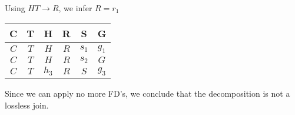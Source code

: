 \documentclass[12pt,letterpaper]{article}
\begin{document}
\begin{enumerate}
\begin{enumerate}
          Using $HT \rightarrow R$, we infer $R = r_1$

          \begin{tabular}{c | c | c | c | c | c}
            C & T & H & R & S & G \\
            \hline
            \hline
            $C$     & $T$   & $H$   & $R$   & $s_1$ & $g_1$ \\
            $C$     & $T$   & $H$   & $R$   & $s_2$ & $G$   \\
            $C$     & $T$   & $h_3$ & $R$   & $S$   & $g_3$ \\
          \end{tabular}

          Since we can apply no more FD's,
          we conclude that the decomposition is not a lossless join.

      \end{enumerate}
  \end{enumerate}
\end{document}
